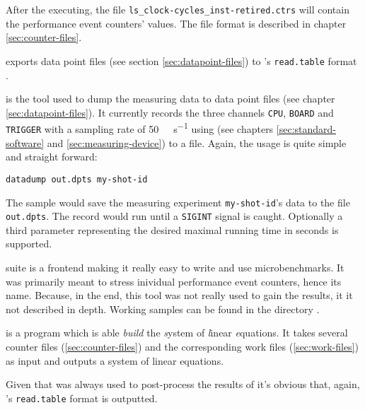 After the executing, the file \texttt{ls\_clock-cycles\_inst-retired.ctrs} will
contain the performance event counters' values. The file format is described in
chapter \ref{sec:counter-files}.


\JWlfour{\JWTde}

\JWTde exports data point files (see section \ref{sec:datapoint-files}) to
\JWTR's \texttt{read.table} format \cite{r11data}.


\JWlfour{\JWTdd}

\JWTdd is the tool used to dump the measuring data to data point files (see
chapter \ref{sec:datapoint-files}). It currently records the three channels
\texttt{CPU}, \texttt{BOARD} and \texttt{TRIGGER} with a sampling rate of
\SI{50}{\kilo\samples\per\second} using \JWTnidaqmxbase (see chapters
\ref{sec:standard-software} and \ref{sec:measuring-device}) to a file.
Again, the usage is quite simple and straight forward:

\begin{lstlisting}[style=Shell]
datadump out.dpts my-shot-id
\end{lstlisting}

The sample would save the measuring experiment \texttt{my-shot-id}'s data to the
file \texttt{out.dpts}. The record would run until a \texttt{SIGINT} signal is
caught. Optionally a third parameter representing the desired maximal running
time in seconds is supported.



\JWTcbs suite is a frontend making it really easy to write and use
microbenchmarks.  It was primarily meant to stress inividual performance event
counters, hence its name. Because, in the end, this tool was not really used to
gain the results, it it not described in depth. Working samples can be found in
the directory .


\JWlfour{\JWTbsle}

\JWTbsle is a  program which is able
\emph{build} the \emph{s}ystem of \emph{l}inear \emph{e}quations. It takes
several counter files (\ref{sec:counter-files}) and the corresponding work files
(\ref{sec:work-files}) as input and outputs a system of linear equations.

Given that \JWTR was always used to post-process the results of \JWTbsle it's
obvious that, again, \JWTR's \texttt{read.table} \cite{r11data} format is
outputted.




